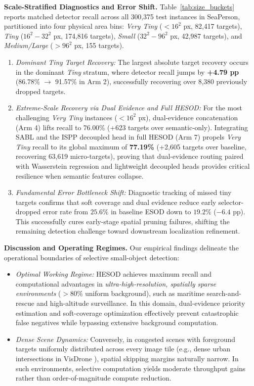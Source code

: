 \textbf{Scale-Stratified Diagnostics and Error Shift.} Table~\ref{tab:size_buckets} reports matched detector recall across all 300,375 test instances in SeaPerson, partitioned into four physical area bins: \emph{Very Tiny} ($<16^2$ px, 82,417 targets), \emph{Tiny} ($16^2-32^2$ px, 174,816 targets), \emph{Small} ($32^2-96^2$ px, 42,987 targets), and \emph{Medium/Large} ($>96^2$ px, 155 targets).
\begin{enumerate}
    \item \emph{Dominant Tiny Target Recovery:} The largest absolute target recovery occurs in the dominant \emph{Tiny} stratum, where detector recall jumps by \textbf{+4.79 pp} (86.78\% $\to$ 91.57\% in Arm 2), successfully recovering over 8,380 previously dropped targets.
    \item \emph{Extreme-Scale Recovery via Dual Evidence and Full HESOD:} For the most challenging \emph{Very Tiny} instances ($<16^2$ px), dual-evidence concatenation (Arm 4) lifts recall to 76.00\% (+623 targets over semantic-only). Integrating SABL and the ISPP decoupled head in full HESOD (Arm 7) propels \emph{Very Tiny} recall to its global maximum of \textbf{77.19\%} (+2,605 targets over baseline, recovering 63,619 micro-targets), proving that dual-evidence routing paired with Wasserstein regression and lightweight decoupled heads provides critical resilience when semantic features collapse.
    \item \emph{Fundamental Error Bottleneck Shift:} Diagnostic tracking of missed tiny targets confirms that soft coverage and dual evidence reduce early selector-dropped error rate from $25.6\%$ in baseline ESOD down to \textbf{$19.2\%$} ($-6.4\text{ pp}$). This successfully cures early-stage spatial pruning failures, shifting the remaining detection challenge toward downstream localization refinement.
\end{enumerate}

\textbf{Discussion and Operating Regimes.} Our empirical findings delineate the operational boundaries of selective small-object detection:
\begin{itemize}
    \item \emph{Optimal Working Regime:} HESOD achieves maximum recall and computational advantages in \emph{ultra-high-resolution, spatially sparse environments} ($>80\%$ uniform background), such as maritime search-and-rescue and high-altitude surveillance. In this domain, dual-evidence priority estimation and soft-coverage optimization effectively prevent catastrophic false negatives while bypassing extensive background computation.
    \item \emph{Dense Scene Dynamics:} Conversely, in congested scenes with foreground targets uniformly distributed across every image tile (e.g., dense urban intersections in VisDrone \cite{VisDrone}), spatial skipping margins naturally narrow. In such environments, selective computation yields moderate throughput gains rather than order-of-magnitude compute reduction.
\end{itemize}
